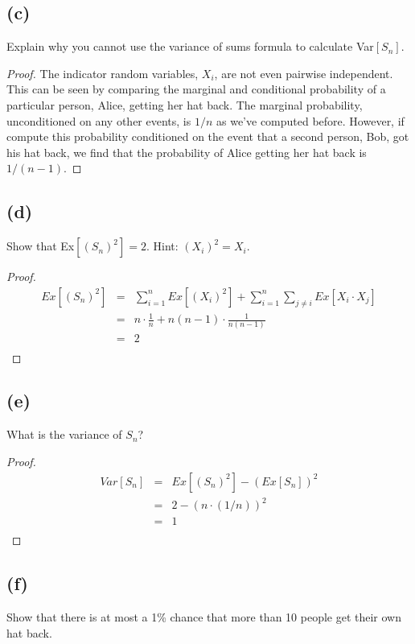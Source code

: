 \documentclass[14pt]{extarticle}
\newcommand{\dps}{\displaystyle}
\begin{document}
\subsection{(c)}
Explain why you cannot use the variance of sums formula to calculate Var$[S_n]$.
\begin{proof}
The indicator random variables, $X_i$, are not even pairwise independent. This can be seen by comparing the marginal and conditional probability of a particular person, Alice, getting her hat back. The marginal probability, unconditioned on any other events, is $1/n$ as we’ve computed before. However, if compute this probability conditioned on the event that a second person, Bob, got his hat back, we find that the probability of Alice getting her hat back is $1/(n - 1)$.
\end{proof}

\subsection{(d)}
Show that Ex$[(S_n)^2] = 2$. Hint: $(X_i)^2 = X_i$.

\begin{proof}
$$
\begin{array}{rcl}
\dps Ex[(S_n)^2] & = & \dps  \sum_{i = 1}^n Ex[(X_i)^2] + \sum_{i = 1}^n \sum_{j \neq i} Ex[X_i \cdot X_j]\\
& = & \dps n \cdot \frac{1}{n} + n(n-1) \cdot \frac{1}{n(n-1)}\\
& = & 2\\
\end{array}
$$
\end{proof}

\subsection{(e)}
What is the variance of $S_n$?

\begin{proof}
$$
\begin{array}{rcl}
Var[S_n] & = & Ex[(S_n)^2] - (Ex[S_n])^2\\
& = & 2 - (n \cdot (1/n))^2\\
& = & 1\\
\end{array}
$$
\end{proof}

\subsection{(f)}
Show that there is at most a 1\% chance that more than 10 people get their own hat back.
\end{document}

